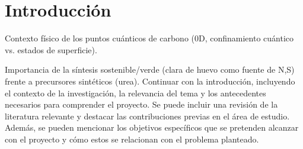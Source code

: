 \section{Introducción}
Contexto físico de los puntos cuánticos de carbono (0D, confinamiento cuántico vs. estados de superficie).
\vspace{1em}

Importancia de la síntesis sostenible/verde (clara de huevo como fuente de N,S) frente a precursores sintéticos (urea).
Continuar con la introducción, incluyendo el contexto de la investigación, la relevancia del tema y los antecedentes necesarios para comprender el proyecto. Se puede incluir una revisión de la literatura relevante y destacar las contribuciones previas en el área de estudio. Además, se pueden mencionar los objetivos específicos que se pretenden alcanzar con el proyecto y cómo estos se relacionan con el problema planteado.

